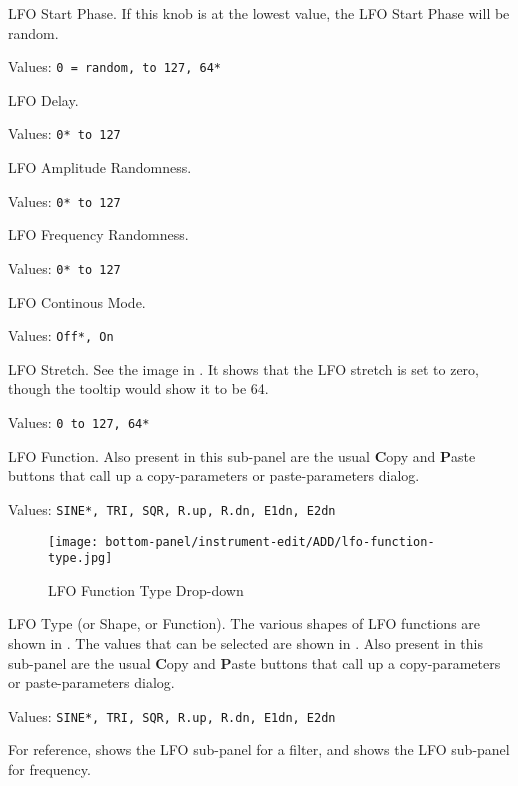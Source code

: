    LFO Start Phase. If this knob is at the lowest value, the LFO Start
   Phase will be random.

   Values: \texttt{0 = random, to 127, 64*}

   LFO Delay.

   Values: \texttt{0* to 127}

   LFO Amplitude Randomness.

   Values: \texttt{0* to 127}

   LFO Frequency Randomness.

   Values: \texttt{0* to 127}

   LFO Continous Mode.

   Values: \texttt{Off*, On}

   LFO Stretch. See the image in
   .
   It shows that the LFO stretch is set to zero,
   though the tooltip would show it to be 64.

   Values: \texttt{0 to 127, 64*}

   LFO Function.
   Also present in this sub-panel are the usual \textbf{C}opy
   and \textbf{P}aste buttons that call up a copy-parameters or
   paste-parameters dialog.

   Values: \texttt{SINE*, TRI, SQR, R.up, R.dn, E1dn, E2dn}

\begin{figure}[H]
   \centering 
   \texttt{[image: bottom-panel/instrument-edit/ADD/lfo-function-type.jpg]}
   \caption[LFO Type Drop-down]{LFO Function Type Drop-down}
   \label{fig:lfo_function_type_dropdown}
\end{figure}

   LFO Type (or Shape, or Function).
   The various shapes of LFO functions are shown in
   .
   The values that can be selected are shown in
   .
   Also present in this sub-panel are the usual \textbf{C}opy
   and \textbf{P}aste buttons that call up a copy-parameters or
   paste-parameters dialog.

   Values: \texttt{SINE*, TRI, SQR, R.up, R.dn, E1dn, E2dn}

   For reference,
   shows the LFO sub-panel for a filter, and
   shows the LFO sub-panel for frequency.

